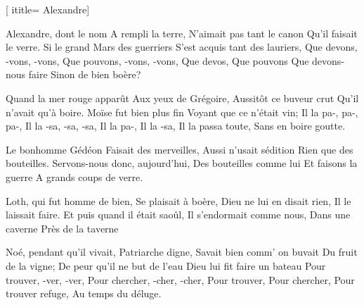 [
ititle= {Alexandre}]


\beginverse
Alexandre, dont le nom
A rempli la terre,
N'aimait pas tant le canon
Qu'il faisait le verre.
Si le grand Mars des guerriers
S'est acquis tant des lauriers,
Que devons, -vons, -vons,
Que pouvons, -vons, -vons,
Que devos,
Que pouvons
Que devons-nous faire
Sinon de bien boère?
\endverse

\beginverse
Quand la mer rouge apparût
Aux yeux de Grégoire,
Aussitôt ce buveur crut
Qu'il n'avait qu'à boire.
Moïse fut bien plus fin
Voyant que ce n'était vin;
Il la pa-, pa-, pa-,
Il la -sa, -sa, -sa,
Il la pa-,
Il la -sa,
Il la passa toute,
Sans en boire goutte.
\endverse

\beginverse
Le bonhomme Gédéon
Faisait des merveilles,
Aussi n'usait sédition
Rien que des bouteilles.
Servons-nous donc, aujourd'hui,
Des bouteilles comme lui
Et faisons la guerre
A grands coups de verre.
\endverse

\beginverse
Loth, qui fut homme de bien,
Se plaisait à boère,
Dieu ne lui en disait rien,
Il le laissait faire.
Et puis quand il était saoûl,
Il s'endormait comme nous,
Dans une caverne
Près de la taverne
\endverse

\beginverse
Noé, pendant qu'il vivait,
Patriarche digne,
Savait bien comm' on buvait
Du fruit de la vigne;
De peur qu'il ne but de l'eau
Dieu lui fit faire un bateau
Pour trouver, -ver, -ver,
Pour chercher, -cher, -cher,
Pour trouver,
Pour chercher,
Pour trouver refuge,
Au temps du déluge.
\endverse

\endsong